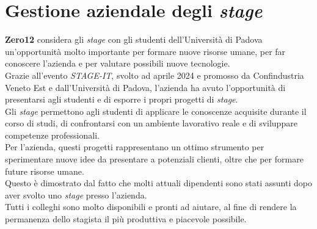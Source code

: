 \section{Gestione aziendale degli \textit{stage}}  
\label{sez:gestione-aziendale-stage}  

\textbf{Zero12} considera gli \textit{stage} con gli studenti dell'Università di Padova un'opportunità molto importante per formare nuove risorse umane,
per far conoscere l'azienda e per valutare possibili nuove tecnologie.\\  
Grazie all'evento \textit{STAGE-IT}, svolto ad aprile 2024 e promosso da Confindustria Veneto Est e dall'Università di Padova, 
l'azienda ha avuto l'opportunità di presentarsi agli studenti e di esporre i propri progetti di \textit{stage}.\\  

\noindent Gli \textit{stage} permettono agli studenti di applicare le conoscenze acquisite durante il corso di studi, 
di confrontarsi con un ambiente lavorativo reale e di sviluppare competenze professionali.\\  
Per l'azienda, questi progetti rappresentano un ottimo strumento per sperimentare nuove idee da presentare a potenziali clienti, 
oltre che per formare future risorse umane.\\  
Questo è dimostrato dal fatto che molti attuali dipendenti sono stati assunti dopo aver svolto uno \textit{stage} presso l'azienda.\\  
Tutti i colleghi sono molto disponibili e pronti ad aiutare, al fine di rendere la permanenza dello stagista il più produttiva e piacevole possibile.\\  
